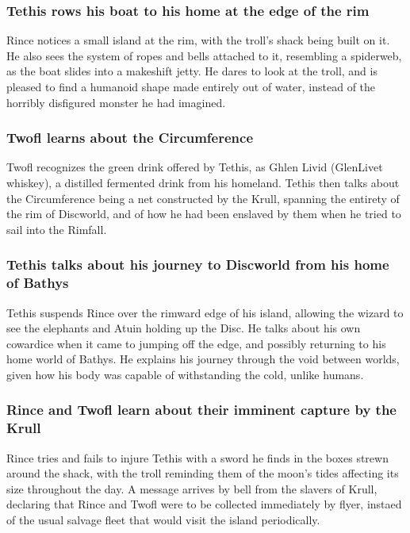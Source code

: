 \subsubsection{\Gls{Tethis} rows his boat to his home at the edge of the rim}
\Gls{Rince} notices a small island at the rim, with the troll's shack being built on it. He also
sees the system of ropes and bells attached to it, resembling a spiderweb, as the boat slides into
a makeshift jetty. He dares to look at the troll, and is pleased to find a humanoid shape made
entirely out of water, instead of the horribly disfigured monster he had imagined.

\subsubsection{\Gls{Twofl} learns about the Circumference}
\Gls{Twofl} recognizes the green drink offered by \Gls{Tethis}, as Ghlen Livid (GlenLivet whiskey),
a distilled fermented drink from his homeland. \Gls{Tethis} then talks about the Circumference being
a net constructed by the Krull, spanning the entirety of the rim of Discworld, and of how he had
been enslaved by them when he tried to sail into the Rimfall.

\subsubsection{\Gls{Tethis} talks about his journey to Discworld from his home of Bathys}
\Gls{Tethis} suspends \Gls{Rince} over the rimward edge of his island, allowing the wizard to
see the elephants and \Gls{Atuin} holding up the Disc. He talks about his own cowardice when it came
to jumping off the edge, and possibly returning to his home world of Bathys. He explains his journey
through the void between worlds, given how his body was capable of withstanding the cold, unlike
humans.

\subsubsection{\Gls{Rince} and \Gls{Twofl} learn about their imminent capture by the Krull}
\Gls{Rince} tries and fails to injure \Gls{Tethis} with a sword he finds in the boxes strewn around
the shack, with the troll reminding them of the moon's tides affecting its size throughout the day.
A message arrives by bell from the slavers of Krull, declaring that \Gls{Rince} and \Gls{Twofl}
were to be collected immediately by flyer, instaed of the usual salvage fleet that would visit the
island periodically.

